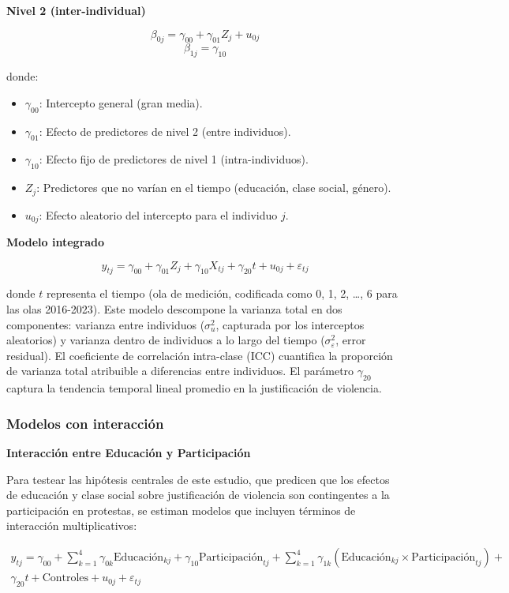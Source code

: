 \documentclass[
  13pt,
]{article}
\providecommand{\tightlist}{%
  \setlength{\itemsep}{0pt}\setlength{\parskip}{0pt}}
\begin{document}
\textbf{Nivel 2 (inter-individual)}

\[\beta_{0j} = \gamma_{00} + \gamma_{01} Z_j + u_{0j}\]
\[\beta_{1j} = \gamma_{10}\]

donde:

\begin{itemize}
\tightlist
\item
  \(\gamma_{00}\): Intercepto general (gran media).
\item
  \(\gamma_{01}\): Efecto de predictores de nivel 2 (entre individuos).
\item
  \(\gamma_{10}\): Efecto fijo de predictores de nivel 1
  (intra-individuos).
\item
  \(Z_j\): Predictores que no varían en el tiempo (educación, clase
  social, género).
\item
  \(u_{0j}\): Efecto aleatorio del intercepto para el individuo \(j\).
\end{itemize}

\textbf{Modelo integrado}

\[y_{tj} = \gamma_{00} + \gamma_{01} Z_j + \gamma_{10} X_{tj} + \gamma_{20} t + u_{0j} + \varepsilon_{tj}\]

donde \(t\) representa el tiempo (ola de medición, codificada como 0, 1,
2, \ldots, 6 para las olas 2016-2023). Este modelo descompone la
varianza total en dos componentes: varianza entre individuos
(\(\sigma^2_u\), capturada por los interceptos aleatorios) y varianza
dentro de individuos a lo largo del tiempo (\(\sigma^2_\varepsilon\),
error residual). El coeficiente de correlación intra-clase (ICC)
cuantifica la proporción de varianza total atribuible a diferencias
entre individuos. El parámetro \(\gamma_{20}\) captura la tendencia
temporal lineal promedio en la justificación de violencia.

\subsubsection{Modelos con
interacción}\label{modelos-con-interacciuxf3n}

\textbf{Interacción entre Educación y Participación}

Para testear las hipótesis centrales de este estudio, que predicen que
los efectos de educación y clase social sobre justificación de violencia
son contingentes a la participación en protestas, se estiman modelos que
incluyen términos de interacción multiplicativos:

\[
\begin{aligned}
y_{tj} = \gamma_{00} + \sum_{k=1}^{4} \gamma_{0k} \text{Educación}_{kj} + \gamma_{10} \text{Participación}_{tj} + \sum_{k=1}^{4} \gamma_{1k} (\text{Educación}_{kj} \times \text{Participación}_{tj}) + \\
\gamma_{20} t + \text{Controles} + u_{0j} + \varepsilon_{tj}
\end{aligned}
\]
\end{document}
